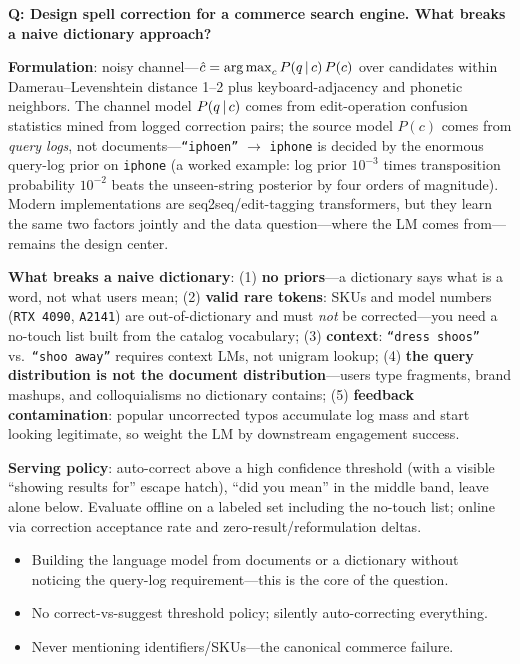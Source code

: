 
\begin{interviewq}
\textbf{Q: Design spell correction for a commerce search engine. What breaks a naive dictionary approach?}

 \quad {} \quad \badgefreq{\freqmed}

\stronganswer

\textbf{Formulation}: noisy channel---$\hat{c} = \operatorname*{arg\,max}_c P(q \,|\, c)\,P(c)$ over candidates within Damerau--Levenshtein distance 1--2 plus keyboard-adjacency and phonetic neighbors. The channel model $P(q \,|\, c)$ comes from edit-operation confusion statistics mined from logged correction pairs; the source model $P(c)$ comes from \textit{query logs}, not documents---\texttt{``iphoen''} $\to$ \texttt{iphone} is decided by the enormous query-log prior on \texttt{iphone} (a worked example: log prior $10^{-3}$ times transposition probability $10^{-2}$ beats the unseen-string posterior by four orders of magnitude). Modern implementations are seq2seq/edit-tagging transformers, but they learn the same two factors jointly and the data question---where the LM comes from---remains the design center.

\textbf{What breaks a naive dictionary}: (1) \textbf{no priors}---a dictionary says what is a word, not what users mean; (2) \textbf{valid rare tokens}: SKUs and model numbers (\texttt{RTX 4090}, \texttt{A2141}) are out-of-dictionary and must \textit{not} be corrected---you need a no-touch list built from the catalog vocabulary; (3) \textbf{context}: \texttt{``dress shoos''} vs.\ \texttt{``shoo away''} requires context LMs, not unigram lookup; (4) \textbf{the query distribution is not the document distribution}---users type fragments, brand mashups, and colloquialisms no dictionary contains; (5) \textbf{feedback contamination}: popular uncorrected typos accumulate log mass and start looking legitimate, so weight the LM by downstream engagement success.

\textbf{Serving policy}: auto-correct above a high confidence threshold (with a visible ``showing results for'' escape hatch), ``did you mean'' in the middle band, leave alone below. Evaluate offline on a labeled set including the no-touch list; online via correction acceptance rate and zero-result/reformulation deltas.

\redflags
\begin{itemize}
    \item Building the language model from documents or a dictionary without noticing the query-log requirement---this is the core of the question.
    \item No correct-vs-suggest threshold policy; silently auto-correcting everything.
    \item Never mentioning identifiers/SKUs---the canonical commerce failure.
\end{itemize}


\end{interviewq}
